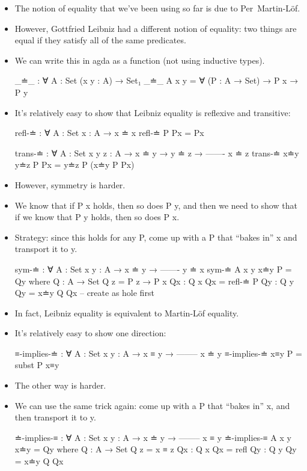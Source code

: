 \documentclass{lecturenotes}
\begin{document}
\begin{itemize}
\item The notion of equality that we've been using so far is due to Per~Martin-L\"of.
\item However, Gottfried Leibniz had a different notion of equality: two things are equal if they satisfy all of the same predicates.
\item We can write this in agda as a function (not using inductive types).
\begin{code}
_≐_ : ∀ {A : Set} (x y : A) → Set₁
_≐_ {A} x y = ∀ (P : A → Set) → P x → P y
\end{code}
\item It's relatively easy to show that Leibniz equality is reflexive and transitive:
\begin{code}
refl-≐ : ∀ {A : Set} {x : A} →
  x ≐ x
refl-≐ P Px = Px

trans-≐ : ∀ {A : Set} {x y z : A} →
   x ≐ y →
   y ≐ z →
  -------
   x ≐ z
trans-≐ x≐y y≐z P Px = y≐z P (x≐y P Px)
\end{code}
\item However, symmetry is harder.
\item We know that if \textsf{P x} holds, then so does \textsf{P y}, and then we need to show that if we know that \textsf{P y} holds, then so does \textsf{P x}.
\item Strategy: since this holds for any \textsf{P}, come up with a \textsf{P} that ``bakes in'' x and transport it to \textsf{y}.
\begin{code}
sym-≐ : ∀ {A : Set} {x y : A} →
  x ≐ y →
  -------
  y ≐ x
sym-≐ {A} {x} {y} x≐y P = Qy
  where
    Q : A → Set
    Q z = P z → P x
    Qx : Q x
    Qx = refl-≐ P
    Qy : Q y
    Qy = x≐y Q Qx -- create as hole first
\end{code}
\pagebreak
\item In fact, Leibniz equality is equivalent to Martin-L\"of equality.
\item It's relatively easy to show one direction:
\begin{code}
≡-implies-≐ : ∀ {A : Set} {x y : A} →
  x ≡ y →
  --------
  x ≐ y
≡-implies-≐ x≡y P = subst P x≡y
\end{code}
\item The other way is harder.
\item We can use the same trick again: come up with a \textsf{P} that ``bakes in'' \textsf{x}, and then transport it to \textsf{y}.
\begin{code}
≐-implies-≡ : ∀ {A : Set} {x y : A} →
  x ≐ y →
  --------
  x ≡ y
≐-implies-≡ {A} {x} {y} x≐y = Qy
  where
    Q : A → Set
    Q z = x ≡ z
    Qx : Q x
    Qx = refl
    Qy : Q y
    Qy = x≐y Q Qx
\end{code}
\end{itemize}
\end{document}
